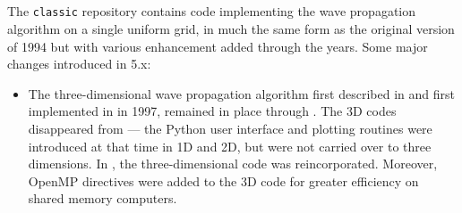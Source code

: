 %
%
%

\subsection{\classic}
The \texttt{classic} repository contains code implementing the wave
propagation algorithm on a single uniform grid, in much the same form as the
original  version of 1994 but with various enhancement added
through the years.  Some major changes introduced in \clawpack 5.x:
\begin{itemize}
    \item The three-dimensional wave propagation algorithm first described
in \cite{jol:thesis, jol-rjl:3d} 
and first implemented in  in 1997, remained in place through
.  The 3D codes 
disappeared from  --- the Python user interface and plotting
routines were introduced at that time in 1D and 2D, but were not 
carried over to three dimensions.  In , the three-dimensional
code was reincorporated.  Moreover, OpenMP directives were added to the 3D code
for greater efficiency on shared memory computers.


\end{itemize}
